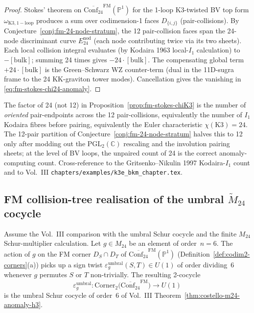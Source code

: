 \begin{proof}
Stokes' theorem on
$\overline{\mathrm{Conf}_{24}}^{\mathrm{FM}}(\mathbb{P}^1)$ for
the 1-loop K3-twisted BV top form $\omega_{\mathrm{K3,1-loop}}$
produces a sum over codimension-1 faces $D_{\{i,j\}}$
(pair-collisions). By
Conjecture~\ref{conj:fm-24-node-stratum}, the 12 pair-collision
faces span the 24-node discriminant curve $E^{\mathrm{nod}}_{24}$
(each node contributing twice via its two sheets). Each local
collision integral evaluates (by Kodaira 1963 local-$I_1$
calculation) to $-[\mathrm{bulk}]$; summing 24 times gives
$-24\cdot[\mathrm{bulk}]$. The compensating global term
$+24\cdot[\mathrm{bulk}]$ is the Green--Schwarz WZ counter-term
(dual in the 11D-sugra frame to the 24 KK-graviton tower
modes). Cancellation gives the vanishing in
\eqref{eq:fm-stokes-chi24-anomaly}.
\end{proof}

\begin{remark}
\label{rem:fm-double-counting}
The factor of 24 (not 12) in
Proposition~\ref{prop:fm-stokes-chiK3} is the number of
\emph{oriented} pair-endpoints across the 12 pair-collisions,
equivalently the number of $I_1$ Kodaira fibres before pairing,
equivalently the Euler characteristic
$\chi(\mathrm{K3}) = 24$. The 12-pair partition of
Conjecture~\ref{conj:fm-24-node-stratum} halves this to 12
only after modding out the $\mathrm{PGL}_2(\mathbb{C})$ rescaling
and the involution pairing sheets; at the level of BV loops, the
unpaired count of 24 is the correct anomaly-computing count.
Cross-reference to the Gritsenko--Nikulin 1997 Kodaira-$I_1$
count and to Vol.~III \texttt{chapters/examples/k3e\_bkm\_chapter.tex}.
\end{remark}

\subsection{FM collision-tree realisation of the umbral
$\widetilde M_{24}$ cocycle}
\label{subsec:fm-umbral-Z6}

\begin{proposition}
\label{prop:fm-umbral-z6-sign}
Assume the Vol.~III comparison with the umbral Schur cocycle and the
finite $M_{24}$ Schur-multiplier calculation. Let $g\in M_{24}$ be an
element of order~$n=6$. The action of $g$
on the FM corner $D_S\cap D_T$ of
$\overline{\mathrm{Conf}_{24}}^{\mathrm{FM}}(\mathbb{P}^1)$
(Definition~\ref{def:codim2-corners}(a)) picks up a sign twist
$\varepsilon_g^{\mathrm{umbral}}(S,T)\in U(1)$ of order
dividing~$6$ whenever $g$ permutes $S$ or $T$ non-trivially. The
resulting 2-cocycle
\begin{equation}
\label{eq:fm-Z6-cocycle}
\varepsilon_g^{\mathrm{umbral}}\colon
\mathrm{Corner}_2\bigl(\overline{\mathrm{Conf}_{24}}^{\mathrm{FM}}\bigr)
\longrightarrow U(1)
\end{equation}
is the umbral Schur cocycle of order~$6$ of
Vol.~III Theorem~\ref{thm:costello-m24-anomaly-h3}.
\end{proposition}

